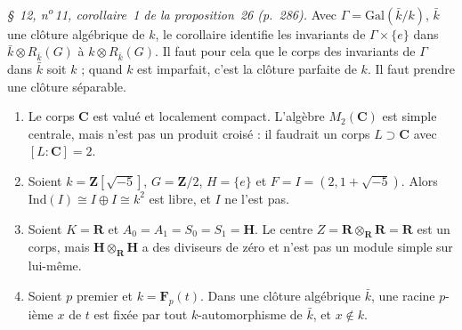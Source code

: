 \emph{§~12, n\textsuperscript{o}\,11, corollaire~1 de la proposition~26 (p.~286).} Avec $\Gamma = \mathrm{Gal}(\bar k/k)$, $\bar k$ une clôture algébrique de $k$, le corollaire identifie les invariants de $\Gamma \times \{e\}$ dans $\bar k \otimes R_{\bar k}(G)$ à $k \otimes R_{\bar k}(G)$. Il faut pour cela que le corps des invariants de $\Gamma$ dans $\bar k$ soit $k$ ; quand $k$ est imparfait, c'est la clôture parfaite de $k$. Il faut prendre une clôture séparable.

\begin{encadre}
\begin{contrexemple}
\mbox{}\begin{enumerate}
\item[a)] Le corps $\mathbf C$ est valué et localement compact. L'algèbre $M_2(\mathbf C)$ est simple centrale, mais n'est pas un produit croisé : il faudrait un corps $L \supset \mathbf C$ avec $[L:\mathbf C] = 2$.
\item[b)] Soient $k = \mathbf Z[\sqrt{-5}]$, $G = \mathbf Z/2$, $H = \{e\}$ et $F = I = (2, 1 + \sqrt{-5})$. Alors $\mathrm{Ind}(I) \cong I \oplus I \cong k^2$ est libre, et $I$ ne l'est pas.
\item[c)] Soient $K = \mathbf R$ et $A_0 = A_1 = S_0 = S_1 = \mathbf H$. Le centre $Z = \mathbf R \otimes_{\mathbf R} \mathbf R = \mathbf R$ est un corps, mais $\mathbf H \otimes_{\mathbf R} \mathbf H$ a des diviseurs de zéro et n'est pas un module simple sur lui-même.
\item[d)] Soient $p$ premier et $k = \mathbf F_p(t)$. Dans une clôture algébrique $\bar k$, une racine $p$-ième $x$ de $t$ est fixée par tout $k$-automorphisme de $\bar k$, et $x \notin k$.
\end{enumerate}
\end{contrexemple}
\end{encadre}

